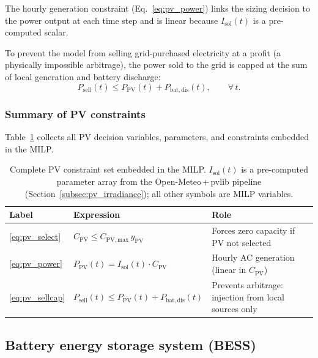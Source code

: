 \documentclass[11pt,a4paper]{report}
\begin{document}
\noindent The hourly generation constraint (Eq.~\eqref{eq:pv_power}) links the
sizing decision to the power output at each time step and is linear because
$I_\mathrm{sol}(t)$ is a pre-computed scalar.

To prevent the model from selling grid-purchased electricity at a profit (a physically
impossible arbitrage), the power sold to the grid is capped at the sum of local
generation and battery discharge:
\begin{equation}
    P_\mathrm{sell}(t) \leq P_\mathrm{PV}(t) + P_\mathrm{bat,dis}(t),
    \qquad \forall\, t.
    \label{eq:pv_sellcap}
\end{equation}

\subsubsection{Summary of PV constraints}

Table~\ref{tab:pv_constraints} collects all PV decision variables, parameters,
and constraints embedded in the MILP.

\begin{table}[H]
\centering
\caption{Complete PV  constraint set embedded in the MILP.
         $I_\mathrm{sol}(t)$ is a pre-computed parameter array from the Open-Meteo\,+\,pvlib
         pipeline (Section~\ref{subsec:pv_irradiance});
         all other symbols are MILP variables.}
\label{tab:pv_constraints}
\begin{tabular}{llp{5.5cm}}
\hline
\textbf{Label} & \textbf{Expression} & \textbf{Role} \\
\hline
\eqref{eq:pv_select}
    & $C_\mathrm{PV} \leq C_\mathrm{PV,max}\,y_\mathrm{PV}$
    & Forces zero capacity if PV not selected \\
\eqref{eq:pv_power}
    & $P_\mathrm{PV}(t) = I_\mathrm{sol}(t)\cdot C_\mathrm{PV}$
    & Hourly AC generation (linear in $C_\mathrm{PV}$) \\
\eqref{eq:pv_sellcap}
    & $P_\mathrm{sell}(t) \leq P_\mathrm{PV}(t) + P_\mathrm{bat,dis}(t)$
    & Prevents arbitrage: injection from local sources only \\
\hline
\end{tabular}
\end{table}

\subsection{Battery energy storage system (BESS)}
\label{sec:bess_model}
\end{document}
